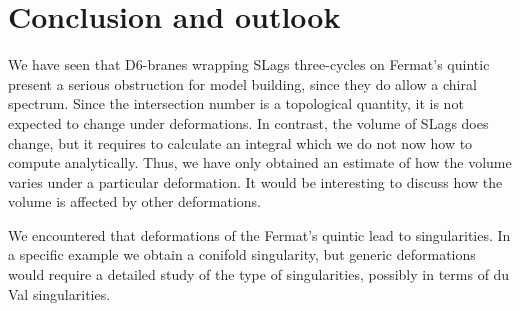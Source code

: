 \chapter{Conclusion and outlook}

We have seen that D$6$-branes wrapping SLags three-cycles on Fermat's quintic present a serious obstruction
for model building, since they do allow a chiral spectrum.
Since the intersection number is a topological quantity, it is not expected to change under deformations.
In contrast, the volume of SLags does change, but it requires to calculate an integral which we do not 
now how to compute analytically.  
Thus, we have only obtained an estimate of how the volume varies under a particular deformation.
It would be interesting to discuss how the volume is affected by other deformations.

We encountered that deformations of the Fermat's quintic lead to singularities.
In a specific example  we obtain a conifold singularity, but generic deformations would require a detailed study of the type of singularities, possibly in terms of du Val singularities.
